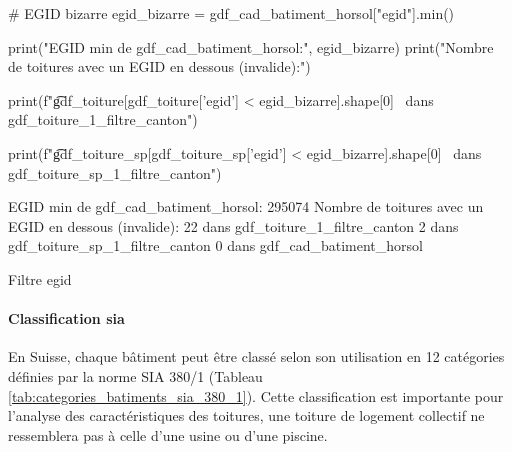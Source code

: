 \begin{code}[H]
    \begin{pythoncode}
    # EGID bizarre
    egid_bizarre = gdf_cad_batiment_horsol["egid"].min()
    
    print("EGID min de gdf_cad_batiment_horsol:", egid_bizarre)
    print("Nombre de toitures avec un EGID en dessous (invalide):")
    
    print(f"\t{gdf_toiture[gdf_toiture['egid'] < egid_bizarre].shape[0]} \
    dans gdf_toiture_1_filtre_canton")
    
    print(f"\t{gdf_toiture_sp[gdf_toiture_sp['egid'] < egid_bizarre].shape[0]} \
    dans gdf_toiture_sp_1_filtre_canton")
    \end{pythoncode}
    \vspace{0.35cm}
    \begin{textcode}
    EGID min de gdf_cad_batiment_horsol: 295074
    Nombre de toitures avec un EGID en dessous (invalide):
        22 dans gdf_toiture_1_filtre_canton
        2 dans gdf_toiture_sp_1_filtre_canton
        0 dans gdf_cad_batiment_horsol
    \end{textcode}
    \caption{Filtre \gls{egid}}
    \label{code:filtre_egid}
\end{code}

\paragraph{Classification \gls{sia}}
En Suisse, chaque bâtiment peut être classé selon son utilisation en 12 catégories définies par la norme SIA 380/1 \cite{sia_sia-shop_nodate} (Tableau \ref{tab:categories_batiments_sia_380_1}). Cette classification est importante pour l'analyse des caractéristiques des toitures, une toiture de logement collectif ne ressemblera pas à celle d'une usine ou d'une piscine.


